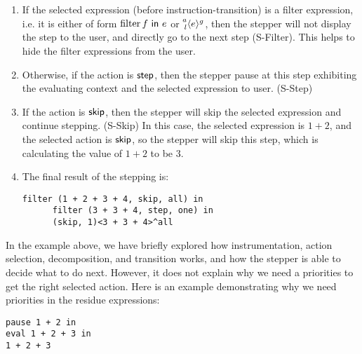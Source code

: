 \begin{enumerate}
  \item If the selected expression (before instruction-transition) is a filter expression, i.e. it is either of form \(\Filter{f}{e}\) or \(\Residue{a}{g}{l}{e}\), then the stepper will not display the step to the user, and directly go to the next step (S-Filter). This helps to hide the filter expressions from the user.

  \item Otherwise, if the action is \(\ActStep\), then the stepper pause at this step exhibiting the evaluating context and the selected expression to user. (S-Step)

  \item If the action is \(\ActSkip\), then the stepper will skip the selected expression and continue stepping. (S-Skip) In this case, the selected expression is \(1 + 2\), and the selected action is \(\ActSkip\), so the stepper will skip this step, which is calculating the value of \(1 + 2\) to be \(3\).

  \item The final result of the stepping is:
    \begin{lstlisting}[language=hazel]
      filter (1 + 2 + 3 + 4, skip, all) in
      filter (3 + 3 + 4, step, one) in
      (skip, 1)<3 + 3 + 4>^all
    \end{lstlisting}
\end{enumerate}

In the example above, we have briefly explored how instrumentation, action selection,  decomposition, and transition works, and how the stepper is able to decide what to do next. However, it does not explain why we need a priorities to get the right selected action. Here is an example demonstrating why we need priorities in the residue expressions:
\begin{lstlisting}[language=hazel]
pause 1 + 2 in
eval 1 + 2 + 3 in
1 + 2 + 3
\end{lstlisting}

